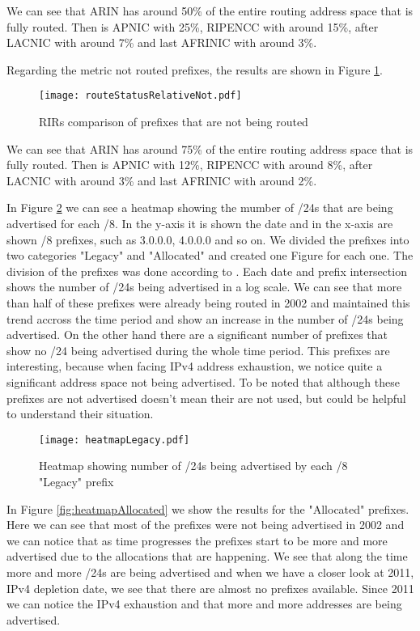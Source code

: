 \documentclass[11pt,a4paper]{scrreprt}
\begin{document}
We can see that ARIN has around 50\% of the entire routing address space that is fully routed. Then is APNIC with 25\%, RIPENCC with around 15\%, after LACNIC with around 7\% and last AFRINIC  with around 3\%. 
\clearpage

Regarding the metric not routed prefixes, the results are shown in Figure \ref{fig:routingStatusRelativeNot}. 

\begin{figure}[!h]
\centering
\texttt{[image: routeStatusRelativeNot.pdf]}
\caption{RIRs comparison of prefixes that are not being routed}
\label{fig:routingStatusRelativeNot}
\end{figure}

We can see that ARIN has around 75\% of the entire routing address space that is fully routed. Then is APNIC with 12\%, RIPENCC with around 8\%, after LACNIC with around 3\% and last AFRINIC  with around 2\%.


In Figure \ref{fig:heatmapLegacy} we can see a heatmap showing the mumber of /24s that are being advertised for each /8. In the y-axis it is shown the date and in the x-axis are shown /8 prefixes, such as 3.0.0.0, 4.0.0.0 and so on. We divided the prefixes into two categories "Legacy" and "Allocated" and created one Figure for each one. The division of the prefixes was done according to \cite{IANA_Address_Space}. Each date and prefix intersection shows the number of /24s being advertised in a log scale. We can see that more than half of these prefixes were already being routed in 2002 and maintained this trend accross the time period and show an increase in the number of /24s being advertised. On the other hand there are a significant number of prefixes that show no /24 being advertised during the whole time period. This prefixes are interesting, because when facing IPv4 address exhaustion, we notice quite a significant address space not being advertised. To be noted that although these prefixes are not advertised doesn't mean their are not used, but could be helpful to understand their situation.  

\begin{figure}[!h]
\centering
\texttt{[image: heatmapLegacy.pdf]}
\caption{Heatmap showing number of /24s being advertised by each /8 "Legacy" prefix}
\label{fig:heatmapLegacy}
\end{figure}

In Figure \ref{fig:heatmapAllocated} we show the results for the "Allocated" prefixes. Here we can see that most of the prefixes were not being advertised in 2002 and we can notice that as time progresses the prefixes start to be more and more advertised due to the allocations that are happening. We see that along the time more and more /24s are being advertised and when we have a closer look at 2011, IPv4 depletion date, we see that there are almost no prefixes available. Since 2011 we can notice the IPv4 exhaustion and that more and more addresses are being advertised.
\end{document}
